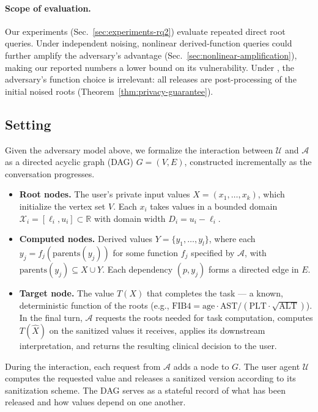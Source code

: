 \paragraph{Scope of evaluation.} Our experiments (Sec.~\ref{sec:experiments-rq2}) evaluate repeated direct root queries. Under independent noising, nonlinear derived-function queries could further amplify the adversary's advantage (Sec.~\ref{sec:nonlinear-amplification}), making our reported numbers a lower bound on its vulnerability. Under \sysname{}, the adversary's function choice is irrelevant: all releases are post-processing of the initial noised roots (Theorem~\ref{thm:privacy-guarantee}).

\subsection{Setting}
\label{sec:setting}
Given the adversary model above, we formalize the interaction between $\mathcal{U}$ and $\mathcal{A}$ as a directed acyclic graph (DAG) $G = (V, E)$, constructed incrementally as the conversation progresses.
 
\begin{itemize}
    \item \textbf{Root nodes.} The user's private input values $X = (x_1, \ldots, x_k)$, which initialize the vertex set $V$. Each $x_i$ takes values in a bounded domain $\mathcal{X}_i = [\ell_i, u_i] \subset \mathbb{R}$ with domain width $D_i = u_i - \ell_i$.
    \item \textbf{Computed nodes.} Derived values $Y = \{y_1, \ldots, y_l\}$, where each $y_j = f_j(\mathrm{parents}(y_j))$ for some function $f_j$ specified by $\mathcal{A}$, with $\mathrm{parents}(y_j) \subseteq X \cup Y$. Each dependency $(p, y_j)$ forms a directed edge in $E$.
    \item \textbf{Target node.} The value $T(X)$ that completes the task --- a known, deterministic function of the roots (e.g., $\text{FIB4} = \text{age} \cdot \text{AST} / (\text{PLT} \cdot \sqrt{\text{ALT}})$). In the final turn, $\mathcal{A}$ requests the roots needed for task computation, computes $T(\hat{X})$ on the sanitized values it receives, applies its downstream interpretation, and returns the resulting clinical decision to the user.
\end{itemize}
 
\noindent During the interaction, each request from $\mathcal{A}$ adds a node to $G$. The user agent $\mathcal{U}$ computes the requested value and releases a sanitized version according to its sanitization scheme. The DAG serves as a stateful record of what has been released and how values depend on one another.
 
